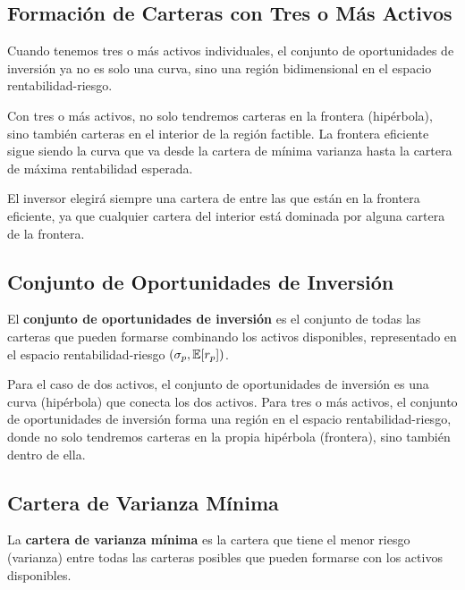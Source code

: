 \subsection{Formación de Carteras con Tres o Más Activos}

Cuando tenemos tres o más activos individuales, el conjunto de oportunidades de inversión ya no es solo una curva, sino una región bidimensional en el espacio rentabilidad-riesgo.

\begin{proposicion}
Con tres o más activos, no solo tendremos carteras en la frontera (hipérbola), sino también carteras en el interior de la región factible. La frontera eficiente sigue siendo la curva que va desde la cartera de mínima varianza hasta la cartera de máxima rentabilidad esperada.
\end{proposicion}

El inversor elegirá siempre una cartera de entre las que están en la frontera eficiente, ya que cualquier cartera del interior está dominada por alguna cartera de la frontera.

\subsection{Conjunto de Oportunidades de Inversión}

\begin{definicion}
El \textbf{conjunto de oportunidades de inversión} es el conjunto de todas las carteras que pueden formarse combinando los activos disponibles, representado en el espacio rentabilidad-riesgo $(\sigma_p, \mathbb{E}[r_p])$.
\end{definicion}

Para el caso de dos activos, el conjunto de oportunidades de inversión es una curva (hipérbola) que conecta los dos activos. Para tres o más activos, el conjunto de oportunidades de inversión forma una región en el espacio rentabilidad-riesgo, donde no solo tendremos carteras en la propia hipérbola (frontera), sino también dentro de ella.

\subsection{Cartera de Varianza Mínima}

\begin{definicion}
La \textbf{cartera de varianza mínima} es la cartera que tiene el menor riesgo (varianza) entre todas las carteras posibles que pueden formarse con los activos disponibles.
\end{definicion}

